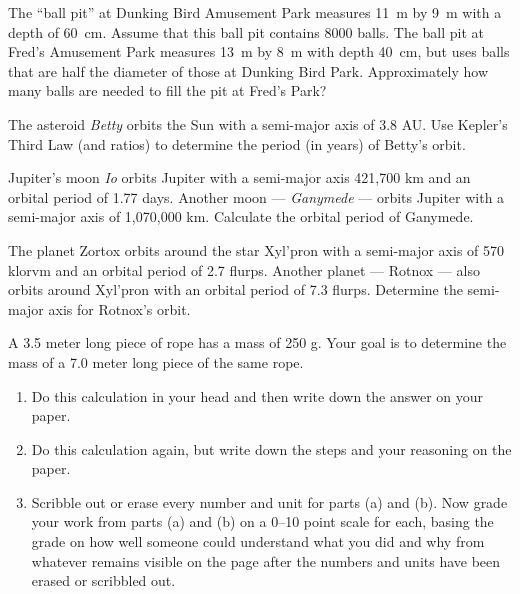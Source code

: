 \begin{exercise}
The ``ball pit'' at Dunking Bird Amusement Park measures 11~m by 9~m
with a depth of 60~cm.  Assume that this ball pit contains 8000 balls.
The ball pit at Fred's Amusement Park measures 13~m by 8~m with depth 
40~cm, but uses balls that are half the diameter of those at Dunking
Bird Park.  Approximately how many balls are needed to fill the pit at
Fred's Park?
\label{problem:ratios_ballpit}
\end{exercise}

\begin{exercise}
The asteroid \emph{Betty} orbits the Sun with a semi-major axis of
3.8 AU.  Use Kepler's Third Law (and ratios) to determine the
period (in years) of Betty's orbit.
\label{problem:asteroid}
\end{exercise}

\begin{exercise}
Jupiter's moon \emph{Io} orbits Jupiter with a semi-major axis
421,700 km and an orbital period of 1.77 days.  Another moon ---
\emph{Ganymede} --- orbits Jupiter with a semi-major axis of
1,070,000 km.  Calculate the orbital period of Ganymede.
\label{problem:Jupiter_Moons}
\end{exercise}

\begin{exercise}
The planet Zortox orbits around the star Xyl'pron with a semi-major
axis of 570 klorvm and an orbital period of 2.7 flurps.  Another
planet --- Rotnox --- also orbits around Xyl'pron with an orbital
period of 7.3 flurps.  Determine the semi-major axis for
Rotnox's orbit.
\label{problem:extrasolar}
\end{exercise}

\begin{exercise}
A 3.5 meter long piece of rope has a mass of 250 g. Your goal is to determine
the mass of a 7.0 meter long piece of the same rope. 
\begin{enumerate}
\item Do this
calculation in your head and then write down the answer on your paper.
\item Do this calculation again, but write down the steps and your reasoning
on the paper.
\item  Scribble out or erase every number and unit for parts
(a) and (b).  Now grade your work from parts (a) and (b) on a 0--10 point
scale for each, basing the grade on how well someone could understand
what you did and why from whatever remains visible on the page after
the numbers and units have been erased or scribbled out.
\end{enumerate}
\label{problem:showyourwork}
\end{exercise}



